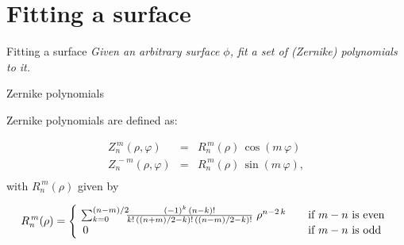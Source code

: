 \documentclass[xetex,10pt]{beamer}
\def\spacer{\vspace*{1em}}
\begin{document}
\section{Fitting a surface}

\begin{frame}[fragile]{Fitting a surface}
	\vfill
	\emph{Given an arbitrary surface $\phi$, fit a set of (Zernike) polynomials to it.}
	\vfill
\end{frame}

\begin{frame}[fragile]{Zernike polynomials}
	
	Zernike polynomials are defined as:
	
	\[
	\begin{array}{lcl}
	Z^{\,m}_n(\rho,\varphi) &=& R^{\,m}_{n}(\rho)\,\cos(m\,\varphi) \! \\
	Z^{\,-\!m}_n(\rho,\varphi) &=& R^{\,m}_{n}(\rho)\,\sin(m\,\varphi), \! \\
  	\end{array}
	\]
	\pause 
	with $R^{\,m}_{n}(\rho)$ given by
	
	\[
	R^{\,m}_{n}(\rho) = \left\{
	\begin{array}{l l}
    \! \sum_{k=0}^{(n-m)/2} \!\!\! \frac{(-1)^k\,(n-k)!}{k!\,((n+m)/2-k)!\,((n-m)/2-k)!} \;\rho^{n-2\,k} & \quad \text{if $m-n$ is even}\\
    0 & \quad \text{if $m-n$ is odd}\\
  	\end{array} \right.
	\]
	\spacer

\end{frame}
\end{document}
